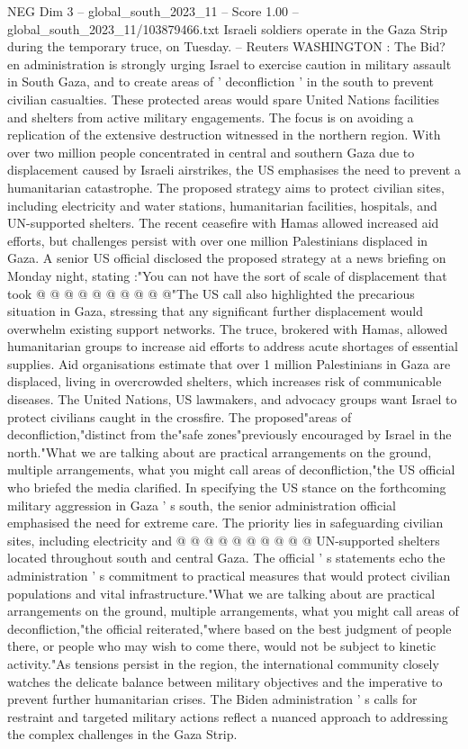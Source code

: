 \begin{textsample}{NEG Dim 3 – global\_south\_2023\_11 – Score 1.00 – global\_south\_2023\_11/103879466.txt}  \label{ex:f3_neg_088}
Israeli soldiers operate in the Gaza Strip during the temporary truce, on Tuesday. -- Reuters WASHINGTON : The Bid? en administration is strongly urging Israel to exercise caution in military assault in South Gaza, and to create areas of ' deconfliction ' in the south to prevent civilian casualties.
These protected areas would spare United Nations facilities and shelters from active military engagements.
The focus is on avoiding a replication of the extensive destruction witnessed in the northern region.
With over two million people concentrated in central and southern Gaza due to displacement caused by Israeli airstrikes, the US emphasises the need to prevent a humanitarian catastrophe.
The proposed strategy aims to protect civilian sites, including electricity and water stations, humanitarian facilities, hospitals, and UN-supported shelters.
The recent ceasefire with Hamas allowed increased aid efforts, but challenges persist with over one million Palestinians displaced in Gaza.
A senior US official disclosed the proposed strategy at a news briefing on Monday night, stating :"You can not have the sort of scale of displacement that took @ @ @ @ @ @ @ @ @ @"The US call also highlighted the precarious situation in Gaza, stressing that any significant further displacement would overwhelm existing support networks.
The truce, brokered with Hamas, allowed humanitarian groups to increase aid efforts to address acute shortages of essential supplies.
Aid organisations estimate that over 1 million Palestinians in Gaza are displaced, living in overcrowded shelters, which increases risk of communicable diseases.
The United Nations, US lawmakers, and advocacy groups want Israel to protect civilians caught in the crossfire.
The proposed"areas of deconfliction,"distinct from the"safe zones"previously encouraged by Israel in the north."What we are talking about are practical arrangements on the ground, multiple arrangements, what you might call areas of deconfliction,"the US official who briefed the media clarified.
In specifying the US stance on the forthcoming military aggression in Gaza ' s south, the senior administration official emphasised the need for extreme care.
The priority lies in safeguarding civilian sites, including electricity and @ @ @ @ @ @ @ @ @ @ UN-supported shelters located throughout south and central Gaza.
The official ' s statements echo the administration ' s commitment to practical measures that would protect civilian populations and vital infrastructure."What we are talking about are practical arrangements on the ground, multiple arrangements, what you might call areas of deconfliction,"the official reiterated,"where based on the best judgment of people there, or people who may wish to come there, would not be subject to kinetic activity."As tensions persist in the region, the international community closely watches the delicate balance between military objectives and the imperative to prevent further humanitarian crises.
The Biden administration ' s calls for restraint and targeted military actions reflect a nuanced approach to addressing the complex challenges in the Gaza Strip.

\end{textsample}
